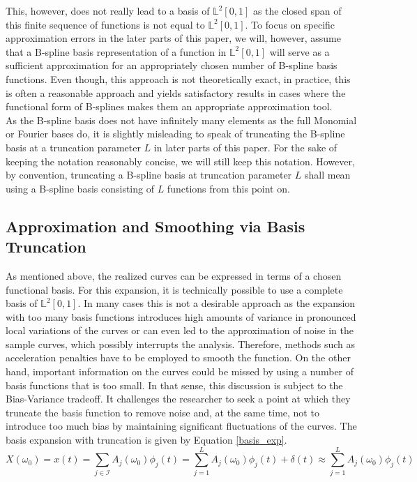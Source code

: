 \documentclass[11pt,twoside,a4paper]{article}
\begin{document}
	This, however, does not really lead to a basis of $\mathbb{L}^2[0,1]$ as the closed span of this finite sequence of functions is not equal to $\mathbb{L}^2[0,1]$. To focus on specific approximation errors in the later parts of this paper, we will, however, assume that a B-spline basis representation of a function in $\mathbb{L}^2[0,1]$ will serve as a sufficient approximation for an appropriately chosen number of B-spline basis functions. 
	Even though, this approach is not theoretically exact, in practice, this is often a reasonable approach and yields satisfactory results in cases where the functional form of B-splines makes them an appropriate approximation tool. \\
	
	As the B-spline basis does not have infinitely many elements as the full Monomial or Fourier bases do, it is slightly misleading to speak of truncating the B-spline basis at a truncation parameter $L$ in later parts of this paper. For the sake of keeping the notation reasonably concise, we will still keep this notation. However, by convention, truncating a B-spline basis at truncation parameter $L$ shall mean using a B-spline basis consisting of $L$ functions from this point on.
	
	\subsection{Approximation and Smoothing via Basis Truncation}
	As mentioned above, the realized curves can be expressed in terms of a chosen functional basis. For this expansion, it is technically possible to use a complete basis of $\mathbb{L}^2[0,1]$. In many cases this is not a desirable approach as the expansion with too many basis functions introduces high amounts of variance in pronounced local variations of the curves or can even led to the approximation of noise in the sample curves, which possibly interrupts the analysis. {\color{red} Therefore, methods such as acceleration penalties have to be employed to smooth the function.} On the other hand, important information on the curves could be missed by using a number of basis functions that is too small. In that sense, this discussion is subject to the Bias-Variance tradeoff. It challenges the researcher to seek a point at which they truncate the basis function to remove noise and, at the same time, not to introduce too much bias by maintaining significant fluctuations of the curves. The basis expansion with truncation is given by Equation \ref{basis_exp}.
	\begin{equation}\label{basis_exp}
		X(\omega_0) = x(t) = \sum_{j \in \mathcal{I}} A_j(\omega_0) \phi_j(t) = \sum_{j = 1}^{L} A_j(\omega_0) \phi_j(t) + \delta(t) \approx \sum_{j = 1}^{L} A_j(\omega_0) \phi_j(t)
	\end{equation}
\end{document}
